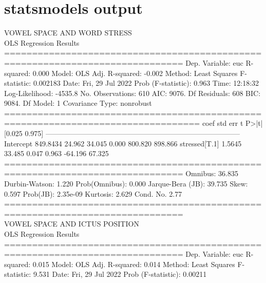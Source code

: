 \chapter{statsmodels output} 
VOWEL SPACE AND WORD STRESS \\
OLS Regression Results \\                           
==============================================================================
Dep. Variable:                    euc   R-squared:                       0.000
Model:                            OLS   Adj. R-squared:                 -0.002
Method:                 Least Squares   F-statistic:                  0.002183
Date:                Fri, 29 Jul 2022   Prob (F-statistic):              0.963
Time:                        12:18:32   Log-Likelihood:                -4535.8
No. Observations:                 610   AIC:                             9076.
Df Residuals:                     608   BIC:                             9084.
Df Model:                           1                                         
Covariance Type:            nonrobust                                         
=================================================================================
                    coef    std err          t      P>|t|      [0.025      0.975]
---------------------------------------------------------------------------------
Intercept       849.8434     24.962     34.045      0.000     800.820     898.866
stressed[T.1]     1.5645     33.485      0.047      0.963     -64.196      67.325
==============================================================================
Omnibus:                       36.835   Durbin-Watson:                   1.220
Prob(Omnibus):                  0.000   Jarque-Bera (JB):               39.735
Skew:                           0.597   Prob(JB):                     2.35e-09
Kurtosis:                       2.629   Cond. No.                         2.77
==============================================================================
\\
VOWEL SPACE AND ICTUS POSITION \\
OLS Regression Results \\                            
==============================================================================
Dep. Variable:                    euc   R-squared:                       0.015
Model:                            OLS   Adj. R-squared:                  0.014
Method:                 Least Squares   F-statistic:                     9.531
Date:                Fri, 29 Jul 2022   Prob (F-statistic):            0.00211
